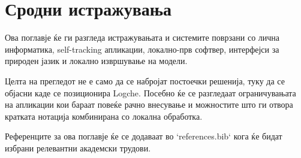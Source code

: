 \chapter{Сродни истражувања}

Ова поглавје ќе ги разгледа истражувањата и системите поврзани со лична информатика, self-tracking апликации, локално-прв софтвер, интерфејси за природен јазик и локално извршување на модели.

Целта на прегледот не е само да се набројат постоечки решенија, туку да се објасни каде се позиционира Logche.
Посебно ќе се разгледаат ограничувањата на апликации кои бараат повеќе рачно внесување и можностите што ги отвора кратката нотација комбинирана со локална обработка.

Референците за ова поглавје ќе се додаваат во `references.bib` кога ќе бидат избрани релевантни академски трудови.

